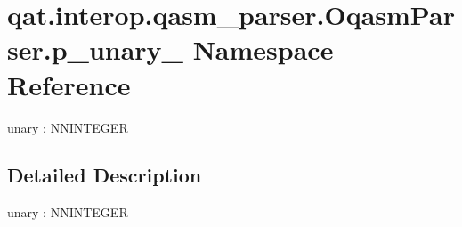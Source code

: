 \hypertarget{namespaceqat_1_1interop_1_1qasm__parser_1_1OqasmParser_1_1p__unary__0}{\section{qat.\-interop.\-qasm\-\_\-parser.\-Oqasm\-Parser.\-p\-\_\-unary\-\_ Namespace Reference}
\label{namespaceqat_1_1interop_1_1qasm__parser_1_1OqasmParser_1_1p__unary__0}
}


unary \-: N\-N\-I\-N\-T\-E\-G\-E\-R  




\subsection{Detailed Description}
unary \-: N\-N\-I\-N\-T\-E\-G\-E\-R 